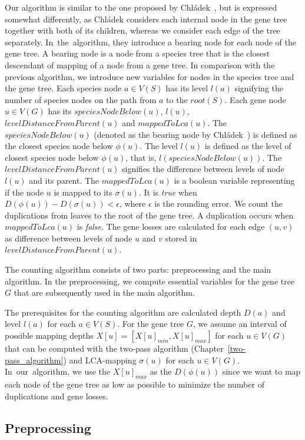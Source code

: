 Our algorithm is similar to the one proposed by Chládek~\cite{chladek_thesis}, but is expressed somewhat differently, as Chládek considers each internal node in the gene tree together with both of its children, whereas we consider each edge of the tree separately. In~the~algorithm, they introduce a bearing node for each node of the gene tree. A bearing node is a node from a species tree that is the closest descendant of mapping of a node from a gene tree.
In comparison with the previous algorithm, we introduce new variables for nodes in the species tree and the gene tree. Each species node $a \in V(S)$ has its level $l(a)$ signifying the number of species nodes on the path from $a$ to the $root(S)$. Each gene node $u \in V(G)$ has its $speciesNodeBelow(u)$, $l(u)$, $levelDistanceFromParent(u)$ and $mappedToLca(u)$. The $speciesNodeBelow(u)$ (denoted as the bearing node by Chládek~\cite{chladek_thesis}) is defined as the closest species node below $\phi(u)$. The level $l(u)$ is defined as the level of closest species node below $\phi(u)$, that is,  $l(speciesNodeBelow(u))$. The $levelDistanceFromParent(u)$ signifies the difference between levels of node $l(u)$ and its parent. The $mappedToLca(u)$ is a boolean variable representing if the node $u$ is mapped to its $\sigma(u)$. It is \emph{true} when $D(\phi(u)) - D(\sigma(u)) < \epsilon$, where $\epsilon$ is the rounding error. We count the duplications from leaves to the root of the gene tree. A duplication occurs when $mappedToLca(u)$ is \emph{false}. The gene losses are calculated for each edge $(u, v)$ as difference between levels of node $u$ and $v$ stored in $levelDistanceFromParent(u)$.

The counting algorithm consists of two parts: preprocessing and the main algorithm. In the preprocessing, we compute essential variables for the gene tree $G$ that are subsequently used in the main algorithm.

The prerequisites for the counting algorithm are calculated depth $D(a)$ and level $l(a)$ for each $a \in V(S)$. For the gene tree $G$, we assume an interval of possible mapping depths $X[u] = [ X[u]_{min}, X[u]_{max} ]$ for each $u \in V(G)$ that can be computed with the two-pass algorithm (Chapter~\ref{two-pass_algorithm}) and LCA-mapping $\sigma(u)$ for each $u \in V(G)$. In~our~algorithm, we use the $X[u]_{max}$ as the $D(\phi(u))$ since we want to map each node of the gene tree as low as possible to minimize the number of duplications and gene losses.

\subsection{Preprocessing} \label{preprocessing}

